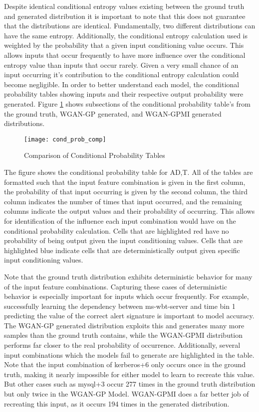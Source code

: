 Despite identical conditional entropy values existing between the ground truth and generated distribution it is important to note that this does not guarantee that the distributions are identical. Fundamentally, two different distributions can have the same entropy. Additionally, the conditional entropy calculation used is weighted by the probability that a given input conditioning value occurs. This allows inputs that occur frequently to have more influence over the conditional entropy value than inputs that occur rarely. Given a very small chance of an input occurring it's contribution to the conditional entropy calculation could become negligible. In order to better understand each model, the conditional probability tables showing inputs and their respective output probability were generated. Figure \ref{fig:make_this} shows subsections of the conditional probability table's from the ground truth, WGAN-GP generated, and WGAN-GPMI generated distributions.

\begin{figure}[!htbp]
	\centering
	\texttt{[image: cond\_prob\_comp]}
	\caption{
		Comparison of Conditional Probability Tables
	}
	\label{fig:make_this}
\end{figure}

The figure shows the conditional probability table for A{\given}D,T. All of the tables are formatted such that the input feature combination is given in the first column, the probability of that input occurring is given by the second column, the third column indicates the number of times that input occurred, and the remaining columns indicate the output values and their probability of occurring. This allows for identification of the influence each input combination would have on the conditional probability calculation. Cells that are highlighted red have no probability of being output given the input conditioning values. Cells that are highlighted blue indicate cells that are deterministically output given specific input conditioning values. 

Note that the ground truth distribution exhibits deterministic behavior for many of the input feature combinations. Capturing these cases of deterministic behavior is especially important for inputs which occur frequently. For example, successfully learning the dependency between ms-wbt-server and time bin 1 predicting the value of the correct alert signature is important to model accuracy. The WGAN-GP generated distribution exploits this and generates many more samples than the ground truth contains, while the WGAN-GPMI distribution performs far closer to the real probability of occurrence. Additionally, several input combinations which the models fail to generate are highlighted in the table. Note that the input combination of kerberos+6 only occurs once in the ground truth, making it nearly impossible for either model to learn to recreate this value. But other cases such as mysql+3 occur 277 times in the ground truth distribution but only twice in the WGAN-GP Model. WGAN-GPMI does a far better job of recreating this input, as it occurs 194 times in the generated distribution.

